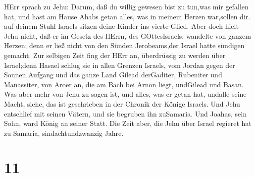 HErr sprach zu Jehu: Darum, daß du willig gewesen bist zu tun,was mir
gefallen hat, und hast am Hause Ahabs getan alles, was in meinem Herzen
war,sollen dir. auf deinem Stuhl Israels sitzen deine Kinder ins vierte
Glied.  Aber doch hielt Jehu nicht, daß er im Gesetz des
HErrn, des GOttesIsraels, wandelte von ganzem Herzen; denn er ließ nicht
von den Sünden Jerobeams,der Israel hatte sündigen gemacht.
 Zur selbigen Zeit fing der HErr an, überdrüssig zu werden
über Israel;denn Hasael schlug sie in allen Grenzen Israels,
 vom Jordan gegen der Sonnen Aufgang und das ganze Land
Gilead derGaditer, Rubeniter und Manassiter, von Aroer an, die am Bach
bei Arnon liegt, undGilead und Basan.  Was aber mehr von
Jehu zu sagen ist, und alles, was er getan hat, undalle seine Macht,
siehe, das ist geschrieben in der Chronik der Könige Israels.
 Und Jehu entschlief mit seinen Vätern, und sie begruben
ihn zuSamaria. Und Joahas, sein Sohn, ward König an seiner Statt.
 Die Zeit aber, die Jehu über Israel regieret hat zu
Samaria, sindachtundzwanzig Jahre.

\hypertarget{section-10}{%
\section{11}\label{section-10}}

